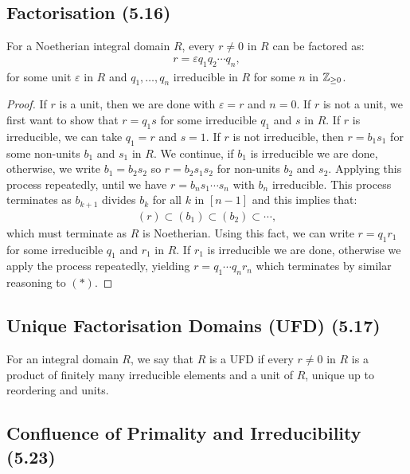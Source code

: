 \subsection{Factorisation (5.16)} \label{5.16}

For a Noetherian integral domain $R$, every $r \neq 0$ in $R$ can be factored as:
\begin{align*}
    r = \varepsilon q_1q_2 \cdots q_n,
\end{align*} for some unit $\varepsilon$ in $R$ and $q_1, \ldots, q_n$ irreducible in $R$
for some $n$ in $\mathbb{Z}_{\geq 0}$.

\begin{proof}
    If $r$ is a unit, then we are done with $\varepsilon = r$ and $n = 0$. If $r$ is
    not a unit, we first want to show that $r = q_1s$ for some irreducible $q_1$ and
    $s$ in $R$.
    \bs
    If $r$ is irreducible, we can take $q_1 = r$ and $s = 1$. If $r$ is not irreducible,
    then $r = b_1s_1$ for some non-units $b_1$ and $s_1$ in $R$. We continue, if $b_1$ 
    is irreducible we are done, otherwise, we write $b_1 = b_2s_2$ so $r = b_2s_1s_2$
    for non-units $b_2$ and $s_2$. Applying this process repeatedly, until we have
    $r = b_ns_1 \cdots s_n$ with $b_n$ irreducible. This process terminates
    as $b_{k + 1}$ divides $b_k$ for all $k$ in $[n - 1]$ and this implies that: \begin{align*}
        (r) \subset (b_1) \subset (b_2) \subset \cdots, \tag{$\ast$}
    \end{align*} which must terminate as $R$ is Noetherian.
    Using this fact, we can write $r = q_1r_1$ for some irreducible $q_1$ and $r_1$ in $R$.
    If $r_1$ is irreducible we are done, otherwise we apply the process repeatedly,
    yielding $r = q_1 \cdots q_nr_n$ which terminates by similar reasoning to $(\ast)$.
\end{proof}

\subsection{Unique Factorisation Domains (UFD) (5.17)} \label{5.17}

For an integral domain $R$, we say that $R$ is a UFD if every $r \neq 0$ in $R$ 
is a product of finitely many irreducible elements and a unit of $R$, unique up to
reordering and units.

\subsection{Confluence of Primality and Irreducibility (5.23)} \label{5.23}

